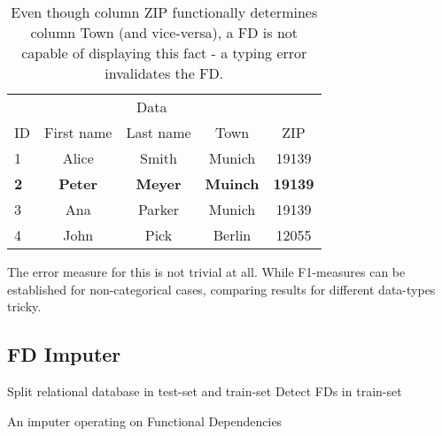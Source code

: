 \begin{table}[ht]
    \centering
    \begin{tabular}{lcccc}
        \toprule
        & \multicolumn{3}{c}{Data} \\ \cmidrule(lr){2-5}
        ID & First name & Last name & Town & ZIP \\
        \midrule
        1 & Alice & Smith & Munich & 19139 \\
        \textbf{2} & \textbf{Peter}& \textbf{Meyer} &
        \textbf{Muinch} & \textbf{19139} \\
        3 & Ana & Parker & Munich & 19139  \\
        4 & John & Pick & Berlin & 12055 \\
        \bottomrule
    \end{tabular}
    \caption{Even though column ZIP functionally determines column Town (and vice-versa), a FD is not capable of displaying this fact - a typing error invalidates the FD.}
    \label{tab:example-afd-necessity}
\end{table}

The error measure for this is not trivial at all. While F1-measures can be established for non-categorical cases, comparing results for different data-types tricky.

\subsection{FD Imputer}


\begin{algorithm}[H]
    \DontPrintSemicolon
    \SetAlgoLined
    \BlankLine

    Split relational database in test-set and train-set\;
    Detect FDs in train-set\;
    \caption{An imputer operating on Functional Dependencies}
\end{algorithm}
